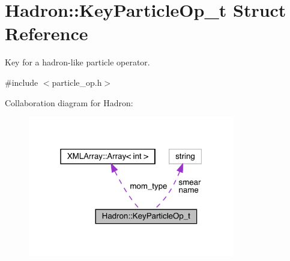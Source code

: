 \hypertarget{structHadron_1_1KeyParticleOp__t}{}\section{Hadron\+:\+:Key\+Particle\+Op\+\_\+t Struct Reference}
\label{structHadron_1_1KeyParticleOp__t}


Key for a hadron-\/like particle operator.  




{\ttfamily \#include $<$particle\+\_\+op.\+h$>$}



Collaboration diagram for Hadron\+:\nopagebreak
\begin{figure}[H]
\begin{center}
\leavevmode
\includegraphics[width=256pt]{db/db4/structHadron_1_1KeyParticleOp__t__coll__graph}
\end{center}
\end{figure}
